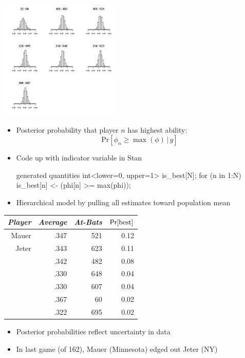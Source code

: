 \documentclass[10pt]{report}
\begin{document}
%
\vspace*{-8pt}
\begin{center}
\includegraphics[height=2.25in]{img/batting-ability-posteriors.png}
\end{center}


%
\vspace*{-2pt}\small
\begin{itemize}
\item Posterior probability that player $n$ has highest ability:
\[
\mbox{Pr}[\phi_n \geq \max(\phi) \, | \, y]
\]
\item Code up with indicator variable in Stan
\begin{stancode}
generated quantities {
  int<lower=0, upper=1> is_best[N];
  for (n in 1:N)
    is_best[n] <- (phi[n] >= max(phi));
}
\end{stancode}
\end{itemize}


%
\begin{itemize}
\item Hierarchical model  by pulling
  all estimates toward population mean
\end{itemize}


%
\begin{center}
{\small
\begin{tabular}{rrrr}
\emph{Player} & \emph{Average} & \emph{At-Bats} & $\text{\sf Pr}[\text{best}]$
\\ \hline
Mauer & .347 & 521 & 0.12
\\
Jeter & .343 & 623 & 0.11
\\
& .342 & 482 & 0.08
\\
& .330 & 648 & 0.04
\\
& .330 & 607 & 0.04
\\
& .367 & 60 & 0.02
\\
& .322 & 695 & 0.02
\end{tabular}
}
\end{center}
\begin{itemize}
\item Posterior probabilities reflect uncertainty in data
\item {\footnotesize In last game (of 162), Mauer (Minnesota) edged out Jeter (NY)}
\end{itemize}
\end{document}
